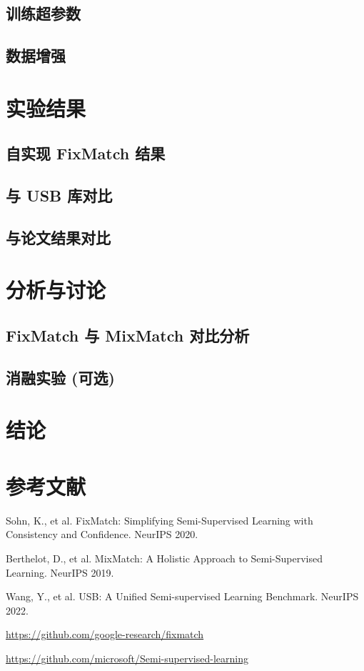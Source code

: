 \documentclass[12pt,a4paper]{article}
\begin{document}
\subsection{训练超参数}

\subsection{数据增强}

\section{实验结果}
\subsection{自实现 FixMatch 结果}

\subsection{与 USB 库对比}

\subsection{与论文结果对比}

\section{分析与讨论}
\subsection{FixMatch 与 MixMatch 对比分析}

\subsection{消融实验 (可选)}

\section{结论}

\section*{参考文献}
\begin{enumerate}[label={[\arabic*]}]
    \item Sohn, K., et al. FixMatch: Simplifying Semi-Supervised Learning with Consistency and Confidence. NeurIPS 2020.
    \item Berthelot, D., et al. MixMatch: A Holistic Approach to Semi-Supervised Learning. NeurIPS 2019.
    \item Wang, Y., et al. USB: A Unified Semi-supervised Learning Benchmark. NeurIPS 2022.
    \item \url{https://github.com/google-research/fixmatch}
    \item \url{https://github.com/microsoft/Semi-supervised-learning}
\end{enumerate}
\end{document}
